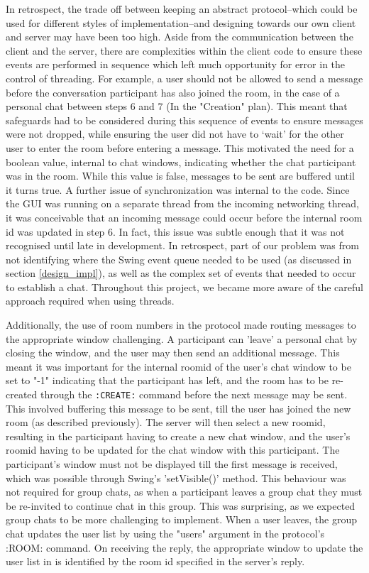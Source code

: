In retrospect, the trade off between keeping an abstract protocol--which could be used for different styles of implementation--and designing towards our own client and server may have been too high. Aside from the communication between the client and the server, there are complexities within the client code to ensure these events are performed in sequence which left much opportunity for error in the control of threading. For example, a user should not be allowed to send a message before the conversation participant has also joined the room, in the case of a personal chat between steps 6 and 7 (In the "Creation" plan). This meant that safeguards had to be considered during this sequence of events to ensure messages were not dropped, while ensuring the user did not have to `wait' for the other user to enter the room before entering a message. This motivated the need for a boolean value, internal to chat windows, indicating whether the chat participant was in the room. While this value is false, messages to be sent are buffered until it turns true. A further issue of synchronization was internal to the code. Since the GUI was running on a separate thread from the incoming networking thread, it was conceivable that an incoming message could occur before the internal room id was updated in step 6. In fact, this issue was subtle enough that it was not recognised until late in development. In retrospect, part of our problem was from not identifying where the Swing event queue needed to be used (as discussed in section \ref{design_impl}), as well as the complex set of events that needed to occur to establish a chat. Throughout this project, we became more aware of the careful approach required when using threads. 

Additionally, the use of room numbers in the protocol made routing messages to the appropriate window challenging. A participant can 'leave' a personal chat by closing the window, and the user may then send an additional message. This meant it was important for the internal roomid of the user's chat window to be set to "-1" indicating that the participant has left, and the room has to be re-created through the \texttt{:CREATE:} command before the next message may be sent. This involved buffering this message to be sent, till the user has joined the new room (as described previously).  The server will then select a new roomid, resulting in the participant having to create a new chat window, and the user's roomid having to be updated for the chat window with this participant. The participant's window must not be displayed till the first message is received, which was possible through Swing's 'setVisible()' method. This behaviour was not required for group chats, as when a participant leaves a group chat they must be re-invited to continue chat in this group. This was surprising, as we expected group chats to be more challenging to implement. When a user leaves, the group chat updates the user list by using the "users" argument in the protocol's {:ROOM:} command. On receiving the reply, the appropriate window to update the user list in is identified by the room id specified in the server's reply.   

